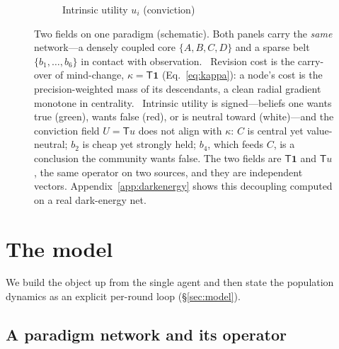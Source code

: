 \documentclass[11pt]{article}
\newcommand{\Top}{\mathsf{T}}          %
\newcommand{\bone}{\mathbf{1}}         %
\begin{document}
\begin{figure}[h!]
\begin{subfigure}{0.49\textwidth}
\caption{Intrinsic utility $u_i$ (conviction)}
\label{sub:util}
\end{subfigure}
\caption{Two fields on one paradigm (schematic). Both panels carry the \emph{same} network---a densely
coupled core $\{A,B,C,D\}$ and a sparse belt $\{b_1,\dots,b_6\}$ in contact with observation.
~Revision cost is the carry-over of mind-change, $\kappa=\Top\bone$
(Eq.~\ref{eq:kappa}): a node's cost is the precision-weighted mass of its descendants, a clean radial
gradient monotone in centrality. ~Intrinsic utility is signed---beliefs one wants
true (green), wants false (red), or is neutral toward (white)---and the conviction field
$U=\Top u$ does not align with $\kappa$: $C$ is central yet value-neutral; $b_2$ is cheap yet strongly
held; $b_4$, which feeds $C$, is a conclusion the community wants false. The two fields are
$\Top\bone$ and $\Top u$, the same operator on two sources, and they are independent vectors.
Appendix~\ref{app:darkenergy} shows this decoupling computed on a real dark-energy net.}
\label{fig:twofields}
\end{figure}

\section{The model}
\label{sec:bmebmr}

We build the object up from the single agent and then state the population dynamics as an explicit
per-round loop (\S\ref{sec:model}).

\subsection{A paradigm network and its operator}
\label{sec:carryover}
\end{document}
